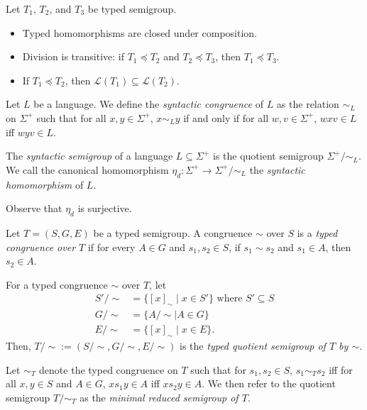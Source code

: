 \documentclass[a4paper,UKenglish,cleveref, autoref, thm-restate, anonymous]{lipics-v2021}
\begin{document}
\begin{proposition}\label{prop:typedsemigroupprops}
    Let $T_1$, $T_2$, and $T_3$ be typed semigroup.
    \begin{itemize}
        \item Typed homomorphisms are closed under composition.
        \item Division is transitive: if $T_1 \preceq T_2$ and $T_2 \preceq T_3$, then $T_1 \preceq T_3$.
        \item If $T_1 \preceq T_2$, then $\mathcal{L}(T_1) \subseteq \mathcal{L}(T_2)$.
    \end{itemize}
\end{proposition}

\begin{definition}\label{def:syncong}
    Let $L$ be a language. We define the \emph{syntactic congruence} of $L$ as the relation $\sim_L$ on $\Sigma^+$ such that for all $x, y \in \Sigma^+$, $x \sim_L y$ if and only if for all $w,v \in \Sigma^+$, $wxv \in L$ iff $wyv \in L$.
\end{definition}
\begin{definition}
    The \emph{syntactic semigroup} of a language $L \subseteq \Sigma^+$ is the quotient semigroup $\Sigma^+/{\sim_L}$. We call the canonical homomorphism $\eta_d : \Sigma^+ \to \Sigma^+/{\sim_L}$ the \emph{syntactic homomorphism} of $L$.
\end{definition}
\begin{remark}
    Observe that $\eta_d$ is surjective.
\end{remark}

\begin{definition}\label{def:typedcongmin}
    Let $T = (S, G, E)$ be a typed semigroup. A congruence $\sim$ over $S$ is a \emph{typed congruence over $T$} if for every $A \in G$ and $s_1,s_2\in S$, if $s_1 \sim s_2$ and $s_1 \in A$, then $s_2 \in A$.

    For a typed congruence $\sim$ over $T$, let
    \begin{align*}
        S'/{\sim} &= \{[x]_\sim \mid x \in S'\} \text{ where $S' \subseteq S$}\\
        G/{\sim} &= \{A/{\sim} \mid A \in G\}\\
        E/{\sim} &= \{[x]_\sim \mid x \in E\}.
    \end{align*}
    \noindent Then, $T/{\sim} := (S/{\sim}, G/{\sim}, E/{\sim})$ is the \emph{typed quotient semigroup of $T$ by $\sim$}.

    Let $\sim_T$ denote the typed congruence on $T$ such that for $s_1,s_2 \in S$, $s_1 \sim_T s_2$ iff for all $x,y \in S$ and $A \in G$, $xs_1y \in A$ iff $xs_2y \in A$. We then refer to the quotient semigroup $T/{\sim_T}$ as the \emph{minimal reduced semigroup of $T$}.
\end{definition}
\end{document}
